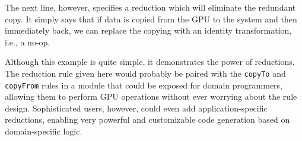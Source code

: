 The next line, however, specifies a reduction which will eliminate the redundant
copy. It simply says that if data is copied from the GPU to the system and then
immediately back, we can replace the copying with an identity transformation,
i.e., a no-op.

Although this example is quite simple, it demonstrates the power of reductions.
The reduction rule given here would probably be paired with the \texttt{copyTo}
and \texttt{copyFrom} rules in a module that could be exposed for domain
programmers, allowing them to perform GPU operations without ever worrying about
the rule design. Sophisticated users, however, could even add
application-specific reductions, enabling very powerful and customizable code
generation based on domain-specific logic.
